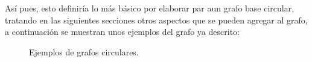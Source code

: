 \documentclass[12pt]{article}
\begin{document}
Así pues, esto definiría lo más básico por elaborar par aun grafo base circular, tratando en las siguientes secciones otros aspectos que se pueden agregar al grafo, a continuación se muestran unos ejemplos del grafo ya descrito:\pagebreak
\begin{figure}[h!]
	\centering
	\caption{Ejemplos de grafos circulares.}\label{Figura 1:}
\end{figure}
\end{document}
